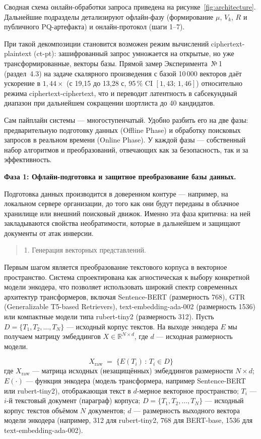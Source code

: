 \documentclass[a4paper, 12pt, oneside, openany]{article}
\begin{document}
Сводная схема онлайн-обработки запроса приведена на рисунке~\ref{fig:architecture}. Дальнейшие подразделы детализируют офлайн-фазу (формирование $\mu$, $V_k$, $R$ и публичного PQ-артефакта) и онлайн-протокол (шаги 1--7).

При такой декомпозиции становится возможен режим вычислений ciphertext-plaintext (ct-pt): зашифрованный запрос умножается на открытые, но уже трансформированные, векторы базы. Прямой замер Эксперимента~№\,1 (раздел~4.3) на задаче скалярного произведения с базой 10\,000 векторов даёт ускорение в $1{,}44\times$ (с 19{,}15 до 13{,}28 с, 95\,\% CI $[1{,}43;\, 1{,}46]$) относительно режима ciphertext-ciphertext, что и переводит латентность в сабсекундный диапазон при дальнейшем сокращении шортлиста до 40 кандидатов.

Сам пайплайн системы — многоступенчатый. Удобно разбить его на две фазы: предварительную подготовку данных (Offline Phase) и обработку поисковых запросов в реальном времени (Online Phase). У каждой фазы — собственный набор алгоритмов и преобразований, отвечающих как за безопасность, так и за эффективность.

\textbf{Фаза 1: Офлайн-подготовка и защитное преобразование базы данных.}

Подготовка данных производится в доверенном контуре — например, на локальном сервере организации, до того как они будут переданы в облачное хранилище или внешний поисковый движок. Именно эта фаза критична: на ней закладываются свойства необратимости, которые в дальнейшем и защищают документы от атак инверсии.

\begin{quote}
1. Генерация векторных представлений.
\end{quote}

Первым шагом является преобразование текстового корпуса в векторное пространство. Система спроектирована как агностическая к выбору конкретной модели энкодера, что позволяет использовать широкий спектр современных архитектур трансформеров, включая Sentence-BERT (размерность 768), GTR (Generalizable T5-based Retrievers), text-embedding-ada-002 (размерность 1536) или компактные модели типа rubert-tiny2 (размерность 312). Пусть $D = \{T_{1}, T_{2}, \ldots, T_{N}\}$ --- исходный корпус текстов. На выходе энкодера $E$ мы получаем матрицу эмбеддингов $X \in \mathbb{R}^{N \times d}$, где $d$ --- исходная размерность модели.


\begin{equation}
	X_{\mathrm{raw}} \;=\; \bigl\{ E(T_{i}) \,:\, T_{i} \in D \bigr\}
	\label{eq:4-1}
\end{equation}
где \(X_{\mathrm{raw}}\) --- матрица исходных (незащищённых) эмбеддингов размерности \(N \times d\); \(E( \cdot )\) --- функция энкодера (модель трансформера, например Sentence-BERT или rubert-tiny2), отображающая текст в \(d\)-мерное векторное пространство; \(T_{i}\) --- \(i\)-й текстовый документ (параграф) корпуса; \(D = \{ T_{1},T_{2},\ldots,T_{N}\}\) --- исходный корпус текстов объёмом \(N\) документов; \(d\) --- размерность выходного вектора модели энкодера (например, 312 для rubert-tiny2, 768 для BERT-base, 1536 для text-embedding-ada-002).
\end{document}
